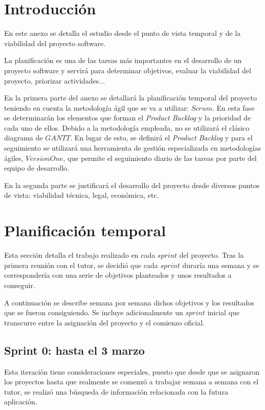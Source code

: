 
\section{Introducción}

En este anexo se detalla el estudio desde el punto de vista temporal y de la viabilidad del proyecto software.

La planificación es una de las tareas más importantes en el desarrollo de un proyecto software y servirá para determinar objetivos, evaluar la viabilidad del proyecto, priorizar actividades...

En la primera parte del anexo se detallará la planificación temporal del proyecto teniendo en cuenta la metodología ágil que se va a utilizar: $Scrum$. En esta fase se determinarán los elementos que forman el \textit{Product Backlog} y la prioridad de cada uno de ellos.
Debido a la metodología empleada, no se utilizará el clásico diagrama de $GANTT$. En lugar de esto, se definirá el \textit{Product Backlog} y para el seguimiento se utilizará una herramienta de gestión especializada en metodologías ágiles, $VersionOne$, que permite el seguimiento diario de las tareas por parte del equipo de desarrollo.

En la segunda parte se justificará el desarrollo del proyecto desde diversos puntos de vista: viabilidad técnica, legal, económica, etc.

\section{Planificación temporal}
Esta sección detalla el trabajo realizado en cada $sprint$ del proyecto. Tras la primera reunión con el tutor, se decidió que cada $sprint$ duraría una semana y se correspondería con una serie de objetivos planteados y unos resultados a conseguir. 

A continuación se describe semana por semana dichos objetivos y los resultados que se fueron consiguiendo. Se incluye adicionalmente un $sprint$ inicial que transcurre entre la asignación del proyecto y el comienzo oficial.

\subsection{Sprint 0: hasta el 3 marzo}

Esta iteración tiene consideraciones especiales, puesto que desde que se asignaron los proyectos hasta que realmente se comenzó a trabajar semana a semana con el tutor, se realizó una búsqueda de información relacionada con la futura aplicación.

